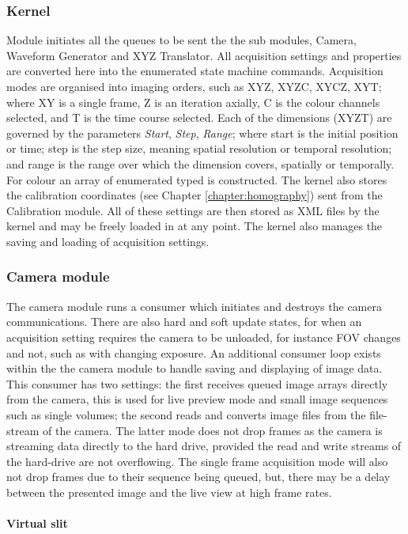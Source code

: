 \subsubsection{Kernel}
Module initiates all the queues to be sent the the sub modules, Camera, Waveform Generator and XYZ Translator.
All acquisition settings and properties are converted here into the enumerated state machine commands.
Acquisition modes are organised into imaging orders, such as XYZ, XYZC, XYCZ, XYT; where XY is a single frame, Z is an iteration axially, C is the colour channels selected, and T is the time course selected.
Each of the dimensions (XYZT) are governed by the parameters \emph{Start}, \emph{Step}, \emph{Range}; where start is the initial position or time; step is the step size, meaning spatial resolution or temporal resolution; and range is the range over which the dimension covers, spatially or temporally.
For colour an array of enumerated typed is constructed.
The kernel also stores the calibration coordinates (see Chapter \ref{chapter:homography}) sent from the Calibration module.
All of these settings are then stored as XML files by the kernel and may be freely loaded in at any point.
The kernel also manages the saving and loading of acquisition settings.


\subsubsection{Camera module}

The camera module runs a consumer which initiates and destroys the camera communications.
There are also hard and soft update states, for when an acquisition setting requires the camera to be unloaded, for instance FOV changes and not, such as with changing exposure.
An additional consumer loop exists within the the camera module to handle saving and displaying of image data.
This consumer has two settings: the first receives queued image arrays directly from the camera, this is used for live preview mode and small image sequences such as single volumes; the second reads and converts image files from the file-stream of the camera.
The latter mode does not drop frames as the camera is streaming data directly to the hard drive, provided the read and write streams of the hard-drive are not overflowing.
The single frame acquisition mode will also not drop frames due to their sequence being queued, but, there may be a delay between the presented image and the live view at high frame rates.

\paragraph{Virtual slit}

